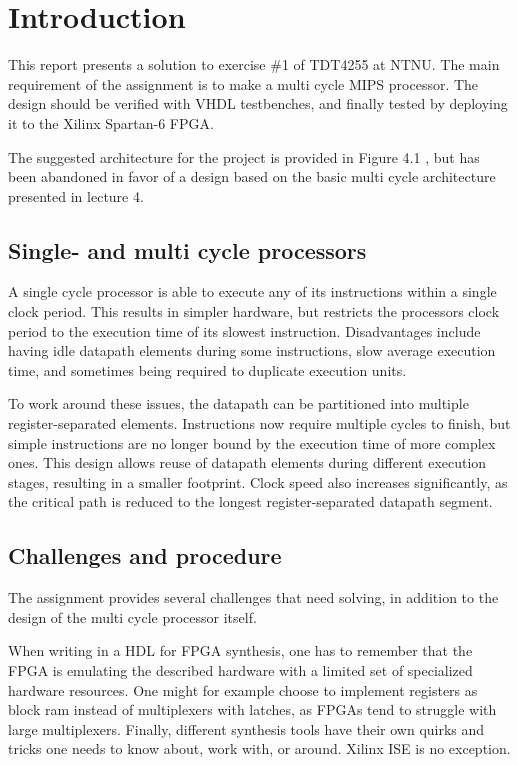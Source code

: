 \section{Introduction}
\label{sec:intro}

This report presents a solution to exercise \#1 of TDT4255 at NTNU.
The main requirement of the assignment is to make a multi cycle MIPS processor\cite[p.47]{compendium}.
The design should be verified with VHDL testbenches, and finally tested by deploying it to the Xilinx Spartan-6 FPGA.

The suggested architecture for the project is provided in Figure 4.1 \cite[p.45]{compendium},
but has been abandoned in favor of a design based on the basic multi cycle architecture presented in lecture 4.\cite{lecture-4}

\subsection{Single- and multi cycle processors}

A single cycle processor is able to execute any of its instructions within a single clock period.
This results in simpler hardware, but restricts the processors clock period to the execution time of its slowest instruction.
Disadvantages include having idle datapath elements during some instructions, slow average execution time, and sometimes being required to duplicate execution units.

To work around these issues, the datapath can be partitioned into multiple register-separated elements.
Instructions now require multiple cycles to finish, but simple instructions are no longer bound by the execution time of more complex ones.
This design allows reuse of datapath elements during different execution stages, resulting in a smaller footprint.
Clock speed also increases significantly, as the critical path is reduced to the longest register-separated datapath segment.

\subsection{Challenges and procedure}

The assignment provides several challenges that need solving, in addition to the design of the multi cycle processor itself.

When writing in a HDL for FPGA synthesis, one has to remember that the FPGA is emulating the described hardware with a limited set of specialized hardware resources.
One might for example choose to implement registers as block ram instead of multiplexers with latches, as FPGAs tend to struggle with large multiplexers.
Finally, different synthesis tools have their own quirks and tricks one needs to know about, work with, or around.
Xilinx ISE is no exception.

